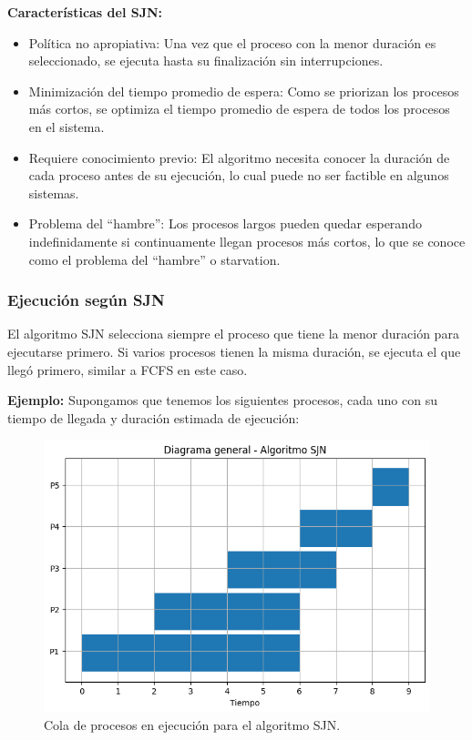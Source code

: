 \textbf{Características del SJN:}
\begin{itemize} 
	\item Política no apropiativa: Una vez que el proceso con la menor duración es seleccionado, se ejecuta hasta su finalización sin interrupciones. 
	\item Minimización del tiempo promedio de espera: Como se priorizan los procesos más cortos, se optimiza el tiempo promedio de espera de todos los procesos en el sistema. \item Requiere conocimiento previo: El algoritmo necesita conocer la duración de cada proceso antes de su ejecución, lo cual puede no ser factible en algunos sistemas. \item Problema del ``hambre'': Los procesos largos pueden quedar esperando indefinidamente si continuamente llegan procesos más cortos, lo que se conoce como el problema del ``hambre'' o starvation. 
\end{itemize}

\subsubsection{Ejecución según SJN}

El algoritmo SJN selecciona siempre el proceso que tiene la menor duración para ejecutarse primero. Si varios procesos tienen la misma duración, se ejecuta el que llegó primero, similar a FCFS en este caso.

\textbf{Ejemplo:}
Supongamos que tenemos los siguientes procesos, cada uno con su tiempo de llegada y duración estimada de ejecución:

\begin{figure}[H] \centering \includegraphics[width=0.8\linewidth]{Imagenes/snj_esquema.png} 
	\caption{Cola de procesos en ejecución para el algoritmo SJN.} 
\end{figure}



